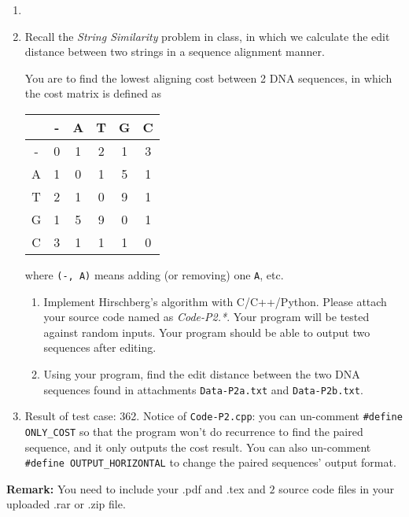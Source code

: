 \documentclass[12pt,a4paper]{article}
\makeatletter
\newtheorem*{solution}{Solution}
\theoremstyle{definition}
\renewenvironment{solution}[1][Solution] {\par\pushQED{\qed}\normalfont\topsep6\p@\@plus6\p@\relax\trivlist\item[\hskip\labelsep\bfseries#1\@addpunct{.}]\ignorespaces}{\popQED\endtrivlist\@endpefalse} \makeatother
\makeatother
\begin{document}
\begin{enumerate}
\begin{solution}
\begin{minipage}[t]{0.89\textwidth}
\begin{algorithm}[H]
        		\;
        		
        	\end{algorithm}
        \end{minipage}
    
    \end{solution}

    \item
    Recall the \emph{String Similarity} problem in class, in which we calculate the edit distance between two strings in a sequence alignment manner.

    You are to find the lowest aligning cost between 2 DNA sequences, in which the cost matrix is defined as

    \begin{center}
        \begin{tabular}{|c||c|c|c|c|c|}
        \hline
          & - & A & T & G & C \\
        \hline
        - & 0 & 1 & 2 & 1 & 3 \\
        A & 1 & 0 & 1 & 5 & 1 \\
        T & 2 & 1 & 0 & 9 & 1 \\
        G & 1 & 5 & 9 & 0 & 1 \\
        C & 3 & 1 & 1 & 1 & 0 \\
        \hline
        \end{tabular}
    \end{center}

    where \texttt{(-, A)} means adding (or removing) one \texttt{A}, etc.

    \begin{enumerate}
        \item
        Implement Hirschberg's algorithm with C/C++/Python. Please attach your source code named as {\color{red}\emph{Code-P2.*}}. Your program will be tested against random inputs. Your program should be able to output two sequences after editing.

        \item
        Using your program, find the edit distance between the two DNA sequences found in attachments \texttt{Data-P2a.txt} and \texttt{Data-P2b.txt}.
    \end{enumerate}
    \begin{solution}
        Result of test case: 362.
    \end{solution}
	Notice of \texttt{Code-P2.cpp}: you can un-comment \texttt{\#define ONLY\_COST} so that the program won't do recurrence to find the paired sequence, and it only outputs the cost result. You can also un-comment \texttt{\#define OUTPUT\_HORIZONTAL} to change the paired sequences' output format.
	
\end{enumerate}

\vspace{20pt}

\textbf{Remark:} You need to include your .pdf and .tex and {\color{red}\emph{$2$}} source code files in your uploaded .rar or .zip file.

\end{document}

